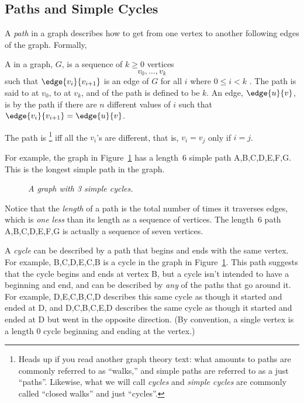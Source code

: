 
\subsection{Paths and Simple Cycles}

A \emph{path} in a graph describes how to get from one vertex to another
following edges of the graph.  Formally,

\begin{definition}
A  in a graph, $G$, is a sequence of $k \geq 0$ vertices
\[
v_0,\dots,v_k
\]
such that $\edge{v_i}{v_{i+1}}$ is an edge of $G$ for all $i$ where $0
\leq i < k$ .  The path is said to  at $v_0$, to  at
$v_k$, and  of the path is defined to be $k$.  An edge,
$\edge{u}{v}$, is  by the path if there are $n$
different values of $i$ such that $\edge{v_i}{v_{i+1}} = \edge{u}{v}$.

The path is \footnote{Heads up if you read another graph
  theory text: what amounts to paths are commonly referred to as
  ``walks,'' and simple paths are referred to as a just ``paths''.
  Likewise, what we will call \emph{cycles} and \emph{simple cycles}
  are commonly called ``closed walks'' and just ``cycles''.}  iff all
the $v_i$'s are different, that is, $v_i = v_j$ only if $i=j$.

\end{definition}

For example, the graph in Figure~\ref{dg} has a length~6 simple path
A,B,C,D,E,F,G.  This is the longest simple path in the graph.

\begin{figure}[htbp] 
\caption{\em A graph with 3 simple cycles.}
\label{dg}
\end{figure}

Notice that the {\em length} of a path is the total number of times it
traverses edges, which is \emph{one less} than its length as a sequence of
vertices.  The length~6 path A,B,C,D,E,F,G is actually a sequence of seven
vertices.

A \emph{cycle} can be described by a path \iffalse of length two or
more\fi that begins and ends with the same vertex.  For example,
B,C,D,E,C,B is a cycle in the graph in Figure~\ref{dg}.  This path
suggests that the cycle begins and ends at vertex B, but a cycle isn't
intended to have a beginning and end, and can be described by \emph{any}
of the paths that go around it.  For example, D,E,C,B,C,D describes this
same cycle as though it started and ended at D, and D,C,B,C,E,D describes
the same cycle as though it started and ended at D but went in the
opposite direction.  (By convention, a single vertex is a length 0 cycle
beginning and ending at the vertex.)

